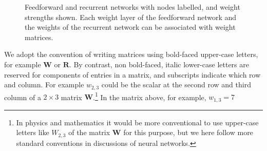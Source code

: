 \begin{figure}[h]
\centering
{}
\hspace*{.7in}
\caption[Simbrain screenshots modified by Jeff Yoshimi.]{Feedforward and recurrent networks with nodes labelled, and weight strengths shown. Each weight layer of the feedforward network and the weights of the recurrent network can be associated with weight matrices. }
\label{labelledNets}
\end{figure}

We adopt the convention of writing matrices using bold-faced upper-case letters, for example $\mathbf{W}$ or $\mathbf{R}$. By contrast, non bold-faced, italic lower-case letters are reserved for components of entries in a matrix, and subscripts indicate which row and column. For example $w_{2,3}$ could be the scalar at the second row and third column of a $2 \times 3$ matrix $\mathbf{W}$.\footnote{In physics and mathematics it would be more conventional to use upper-case letters like $W_{2,3}$ of the matrix $\mathbf{W}$ for this purpose, but we here follow more standard conventions in discussions of neural networks.} In the matrix above, for example, $w_{1,3} = 7 $

